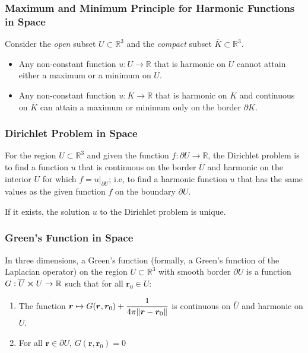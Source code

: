 \documentclass[11pt, a4paper]{article}
\newcommand{\R}{\mathbb{R}} %
\begin{document}
\subsubsection{Maximum and Minimum Principle for Harmonic Functions in Space}
Consider the \textit{open} subset $ U \subset \R^{3} $ and the \textit{compact} subset $ \overline{K} \subset \R^3 $.
\begin{itemize}
	\item Any non-constant function $ u : U \to \R $ that is harmonic on $ U $ cannot attain either a maximum or a minimum on $ U $. 

	\item Any non-constant function $ u : \overline{K} \to \R $ that is harmonic on $ K $ and continuous on $ \overline{K} $ can attain a maximum or minimum only on the border $ \partial K $. 
\end{itemize}


\subsubsection{Dirichlet Problem in Space}


For the region $ U \subset \R^3 $ and given the function $ f : \partial U \to \R $, the Dirichlet problem is to find a function $ u $ that is continuous on the border $ \overline{U} $ and harmonic on the interior $ U $ for which $ \displaystyle{f = u \big |_{\partial U}} $; i.e, to find a harmonic function $ u $ that has the same values as the given function $ f $ on the boundary $ \partial U $.

If it exists, the solution $ u $ to the Dirichlet problem is unique.



\subsubsection{Green's Function in Space}
In three dimensions, a Green's function (formally, a Green's function of the Laplacian operator) on the region $ U \subset \R^3 $ with smooth border $ \partial U $ is a function $ G : \overline{U} \cross U \to \R $ such that for all $ \bm{r}_0 \in U $:
\begin{enumerate}
	\item The function $ \displaystyle{\bm{r} \mapsto G(\bm{r}, \bm{r}_0) + \frac{1}{4\pi \norm{\bm{r} - \bm{r}_0}}   } $ is continuous on $ \overline{U} $ and harmonic on $ U $.
	\item For all $ \bm{r} \in \partial U $, $ G(\bm{r}, \bm{r}_0) = 0 $
\end{enumerate}
\end{document}
